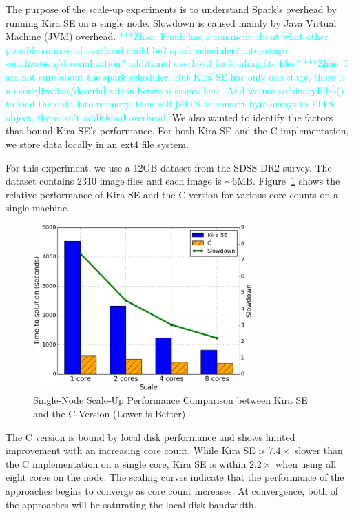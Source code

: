 \documentclass[conference]{IEEEtran}
\newcommand{\zhaonote}[1]{{\textcolor{cyan}    { ***Zhao:      #1 }}}
\newcommand{\zhaonote}[1]{}
\newcommand{\up}{\vspace*{-1em}}
\begin{document}
The purpose of the scale-up experiments is to understand Spark's overhead by running
Kira SE on a single node. Slowdown is caused mainly by Java Virtual Machine (JVM) overhead. 
\zhaonote{Frank has a comment about what other possible sources of overhead could be?
spark scheduler? inter-stage serialization/deserialization? additional overhead for loading fits files?}
\zhaonote{I am not sure about the spark scheduler. But Kira SE has only one stage, there is no serialization/deserialization
between stages here. And we use sc.binaryFiles() to load the data into memory, then call jFITS to convert byte arrays to FITS
object, there isn't additional overhead.}
We also wanted to identify the factors
that bound Kira SE's performance. For both Kira SE and the C implementation, we store data
locally in an ext4 file system.

For this experiment, we use a 12GB dataset from the SDSS DR2 survey. The dataset contains
2310 image files and each image is $\sim$6MB.
Figure~\ref{fig:scaleup} shows the relative
performance of Kira SE and the C version for various core counts on a single machine.

\begin{figure}[h]
	\begin{center}
		\includegraphics[width=85mm]{pictures/scaleup}
		\caption{Single-Node Scale-Up Performance Comparison between Kira SE and the C Version (Lower is Better)
		\label{fig:scaleup}}
		\up\up
  	\end{center}
\end{figure}

The C version is bound by local disk performance and shows limited improvement with
an increasing core count. While Kira SE is $7.4\times$ slower than the C implementation
on a single core, Kira SE is within $2.2\times$ when using all eight cores on the node.
The scaling curves indicate that the performance of the approaches begins to converge
as core count increases. At convergence, both of the approaches will be saturating the local
disk bandwidth.
\end{document}
